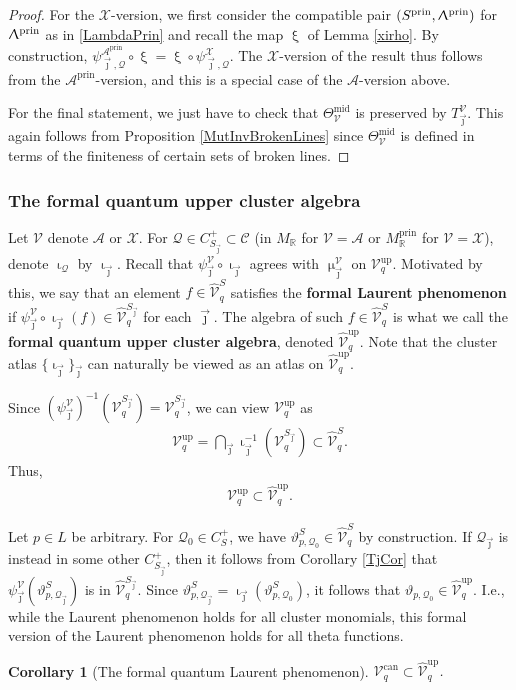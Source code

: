 \documentclass{amsart}
\DeclareMathOperator{\prin}{prin}
\DeclareMathOperator{\up}{up}
\DeclareMathOperator{\midd}{mid}
\DeclareMathOperator{\can}{can}
\let\bb=\mathbb
\let\s=\mathcal
\let\wh=\widehat
\newcommand {\sQ} {\mathcal{Q}}
\newcommand {\jj} {\vec{\jmath}}
\renewcommand{\iota}{\upiota}
\renewcommand{\xi}{\upxi}
\renewcommand{\Lambda}{\Uplambda}
\renewcommand{\mu}{\upmu}
\theoremstyle{plain}%
\newtheorem{cor}[thm]{Corollary}
\theoremstyle{definition}
\theoremstyle{remark}
\begin{document}
\begin{proof}
For the $\s{X}$-version, we first consider the compatible pair $(S^{\prin},\Lambda^{\prin})$ for $\Lambda^{\prin}$ as in \eqref{LambdaPrin} and recall the map $\xi$ of Lemma \ref{xirho}.  By construction, $\psi_{\jj,\sQ}^{\s{A}^{\prin}}\circ \xi = \xi \circ \psi_{\jj,\sQ}^{\s{X}}$.  The $\s{X}$-version of the result thus follows from the $\s{A}^{\prin}$-version, and this is a special case of the $\s{A}$-version above.

For the final statement, we just have to check that $\Theta_{\s{V}}^{\midd}$ is preserved by $T_{\jj}^{\s{V}}$.  This again follows from Proposition \ref{MutInvBrokenLines} since $\Theta_{\s{V}}^{\midd}$ is defined in terms of the finiteness of certain sets of broken lines.
\end{proof}


\subsubsection{The formal quantum upper cluster algebra}\label{FormalUp}
Let $\s{V}$ denote $\s{A}$ or $\s{X}$.  For $\sQ\in C_{S_{\jj}}^+\subset \s{C}$ (in $M_{\bb{R}}$ for $\s{V}=\s{A}$ or $M_{\bb{R}}^{\prin}$ for $\s{V}=\s{X}$), denote $\iota_{\s{Q}}$ by $\iota_{\jj}$.  Recall that $\psi_{\jj}^{\s{V}}\circ \iota_{\jj}$ agrees with $\mu^{\s{V}}_{\jj}$ on $\s{V}_q^{\up}$.  Motivated by this, we say that an element $f\in \wh{\s{V}}_q^S$ satisfies the \textbf{formal Laurent phenomenon} if $\psi_{\jj}^{\s{V}}\circ \iota_{\jj}(f)\in \wh{\s{V}}_q^{S_{\jj}}$ for each $\jj$.  The algebra of such $f\in \wh{\s{V}}_q^S$ is what we call the \textbf{formal quantum upper cluster algebra}, denoted $\wh{\s{V}}_q^{\up}$.  Note that the cluster atlas $\{\iota_{\jj}\}_{\jj}$ can naturally be viewed as an atlas on $\wh{\s{V}}_q^{\up}$.

 Since $(\psi_{\jj}^{\s{V}})^{-1}(\s{V}_q^{S_{\jj}})=\s{V}_q^{S_{\jj}}$, we can view $\s{V}_q^{\up}$ as 
\begin{align*}
    \s{V}_q^{\up}=\bigcap_{\jj} \iota_{\jj}^{-1}(\s{V}_q^{S_{\jj}})\subset \wh{\s{V}}_q^S.
\end{align*}
Thus,
\begin{align*}
    \s{V}_q^{\up}\subset \wh{\s{V}}_q^{\up}.
\end{align*}

Let $p\in L$ be arbitrary.  For $\sQ_0\in C_S^+$, we have $\vartheta^S_{p,\sQ_0}\in \wh{\s{V}}_q^S$ by construction.  If $\sQ_{\jj}$ is instead in some other $C_{S_{\jj}}^+$, then it follows from Corollary \ref{TjCor} that $\psi_{\jj}^{\s{V}}(\vartheta^S_{p,\sQ_{\jj}})$ is in $\wh{\s{V}}_q^{S_{\jj}}$.  Since $\vartheta^S_{p,\sQ_{\jj}} = \iota_{\jj}(\vartheta^S_{p,\sQ_{0}})$, it follows that $\vartheta_{p,\sQ_0} \in \wh{\s{V}}_q^{\up}$.  I.e., while the Laurent phenomenon holds for all cluster monomials, this formal version of the Laurent phenomenon holds for all theta functions.
\begin{cor}[The formal quantum Laurent phenomenon]\label{FormalLaurent}
$\s{V}_q^{\can} \subset \wh{\s{V}}_q^{\up}$.
\end{cor}


%
\end{document}
